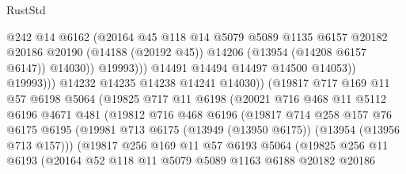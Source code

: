 \begin{lexlean}{RustStd}
\begin{coremodule}
                                  @242
                                  @14
                                  @6162
                                  (@20164
                                    @45
                                    @118
                                    @14
                                    @5079
                                    @5089
                                    @1135
                                    @6157
                                    @20182
                                    @20186
                                    @20190
                                    (@14188 (@20192 @45))
                                    @14206
                                    (@13954 (@14208 @6157 @6147))
                                    @14030))
                                @19993)))
                          @14491
                          @14494
                          @14497
                          @14500
                          @14053))
                      @19993)))
                @14232
                @14235
                @14238
                @14241
                @14030))
            (@19817
              @717
              @169
              @11
              @57
              @6198
              @5064
              (@19825
                @717
                @11
                @6198
                (@20021
                  @716
                  @468
                  @11
                  @5112
                  @6196
                  @4671
                  @481
                  (@19812
                    @716
                    @468
                    @6196
                    (@19817
                      @714
                      @258
                      @157
                      @76
                      @6175
                      @6195
                      (@19981 @713 @6175 (@13949 (@13950 @6175)) (@13954 (@13956 @713 @157)))
                      (@19817
                        @256
                        @169
                        @11
                        @57
                        @6193
                        @5064
                        (@19825
                          @256
                          @11
                          @6193
                          (@20164
                            @52
                            @118
                            @11
                            @5079
                            @5089
                            @1163
                            @6188
                            @20182
                            @20186

\end{coremodule}
\end{lexlean}

